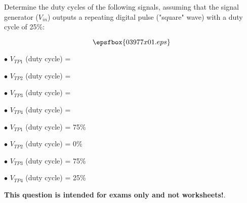 

Determine the duty cycles of the following signals, assuming that the signal generator ($V_{in}$) outputs a repeating digital pulse ("square" wave) with a duty cycle of 25\%:

$$\epsfbox{03977x01.eps}$$

\medskip
\item{$\bullet$} $V_{TP1}$ (duty cycle) = 
\vskip 5pt
\item{$\bullet$} $V_{TP2}$ (duty cycle) = 
\vskip 5pt
\item{$\bullet$} $V_{TP3}$ (duty cycle) = 
\vskip 5pt
\item{$\bullet$} $V_{TP4}$ (duty cycle) = 
\medskip







\medskip
\item{$\bullet$} $V_{TP1}$ (duty cycle) = 75\%
\vskip 5pt
\item{$\bullet$} $V_{TP2}$ (duty cycle) = 0\%
\vskip 5pt
\item{$\bullet$} $V_{TP3}$ (duty cycle) = 75\%
\vskip 5pt
\item{$\bullet$} $V_{TP4}$ (duty cycle) = 25\%
\medskip







{\bf This question is intended for exams only and not worksheets!}.



